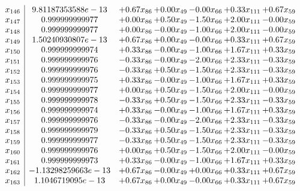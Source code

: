 \documentclass[8pt]{article}
\begin{document}
\[\begin{array}{c| c c@{\hskip 2pt} c@{\hskip 2pt} c@{\hskip 2pt} c@{\hskip 2pt} c@{\hskip 2pt} }
 x_{146}   &  9.81187353588e-13 & +  0.67 x_{86} & +  0.00 x_{49} & -0.00 x_{66} & +  0.33 x_{111} & +  0.67 x_{59}\\
 x_{147}   &  0.999999999977 & +  0.00 x_{86} & +  0.50 x_{49} & -1.50 x_{66} & +  2.00 x_{111} & -0.00 x_{59}\\
 x_{148}   &  0.999999999977 & +  0.00 x_{86} & -0.00 x_{49} & -1.00 x_{66} & +  2.00 x_{111} & -0.00 x_{59}\\
 x_{149}   &  1.50240930807e-13 & +  0.67 x_{86} & +  0.00 x_{49} & -0.00 x_{66} & +  0.33 x_{111} & +  0.67 x_{59}\\
 x_{150}   &  0.999999999974 & +  0.33 x_{86} & -0.00 x_{49} & -1.00 x_{66} & +  1.67 x_{111} & +  0.33 x_{59}\\
 x_{151}   &  0.999999999976 & -0.33 x_{86} & -0.00 x_{49} & -2.00 x_{66} & +  2.33 x_{111} & -0.33 x_{59}\\
 x_{152}   &  0.999999999976 & -0.33 x_{86} & +  0.50 x_{49} & -1.50 x_{66} & +  2.33 x_{111} & -0.33 x_{59}\\
 x_{153}   &  0.999999999975 & +  0.33 x_{86} & -0.00 x_{49} & -1.00 x_{66} & +  1.67 x_{111} & +  0.33 x_{59}\\
 x_{154}   &  0.999999999977 & +  0.00 x_{86} & +  0.50 x_{49} & -1.50 x_{66} & +  2.00 x_{111} & -0.00 x_{59}\\
 x_{155}   &  0.999999999978 & -0.33 x_{86} & +  0.50 x_{49} & -1.50 x_{66} & +  2.33 x_{111} & -0.33 x_{59}\\
 x_{156}   &  0.999999999974 & +  0.33 x_{86} & -0.00 x_{49} & -1.00 x_{66} & +  1.67 x_{111} & +  0.33 x_{59}\\
 x_{157}   &  0.999999999976 & -0.33 x_{86} & -0.00 x_{49} & -2.00 x_{66} & +  2.33 x_{111} & -0.33 x_{59}\\
 x_{158}   &  0.999999999979 & -0.33 x_{86} & +  0.50 x_{49} & -1.50 x_{66} & +  2.33 x_{111} & -0.33 x_{59}\\
 x_{159}   &  0.999999999977 & -0.33 x_{86} & +  0.50 x_{49} & -1.50 x_{66} & +  2.33 x_{111} & -0.33 x_{59}\\
 x_{160}   &  0.999999999976 & +  0.00 x_{86} & +  0.50 x_{49} & -1.50 x_{66} & +  2.00 x_{111} & -0.00 x_{59}\\
 x_{161}   &  0.999999999973 & +  0.33 x_{86} & -0.00 x_{49} & -1.00 x_{66} & +  1.67 x_{111} & +  0.33 x_{59}\\
 x_{162}   &  -1.13298259663e-13 & +  0.67 x_{86} & -0.00 x_{49} & +  0.00 x_{66} & +  0.33 x_{111} & +  0.67 x_{59}\\
 x_{163}   &  1.1046719095e-13 & +  0.67 x_{86} & +  0.00 x_{49} & -0.00 x_{66} & +  0.33 x_{111} & +  0.67 x_{59}\\

\end{array}\]
\end{document}
